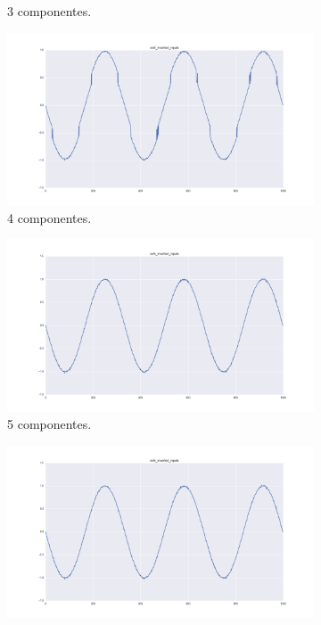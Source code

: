 \documentclass[11pt,spanish,listoffigures,listoftables]{tfgetsinf}
\begin{document}
\begin{figure}[H]
\begin{subfigure}[h]{0.33\textwidth}
            \caption{3 componentes.}
            \label{fig:col5_inverted_nipals3}
        \end{subfigure}
        \begin{subfigure}[h]{0.33\textwidth}
            \centering
            \includegraphics[width=\textwidth]{simulated_data_8_columns/col5_inverted_nipals_4.png}
            \caption{4 componentes.}
            \label{fig:col5_inverted_nipals4}
        \end{subfigure}
        \begin{subfigure}[h]{0.33\textwidth}
            \centering
            \includegraphics[width=\textwidth]{simulated_data_8_columns/col5_inverted_nipals_5.png}
            \caption{5 componentes.}
            \label{fig:col5_inverted_nipals5}
        \end{subfigure}
        \begin{subfigure}[h]{0.33\textwidth}
            \centering
            \includegraphics[width=\textwidth]{simulated_data_8_columns/col5_inverted_nipals_6.png}

\end{subfigure}
\end{figure}
\end{document}
